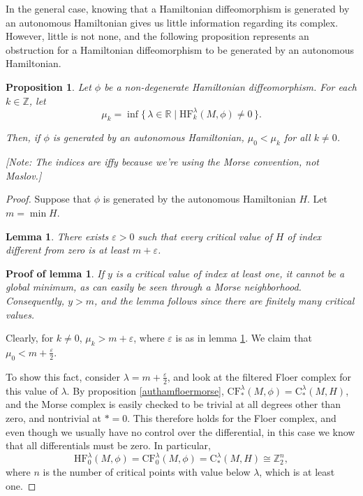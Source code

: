 \documentclass{article}
\newtheorem{prop}{Proposition}
\newtheorem{lemma}{Lemma}
\theoremstyle{nonumberplain}
\newtheorem{proof}{Proof}
\newtheorem{lemmaproof}{Proof of lemma}
\newcommand{\R}{\mathbb{R}}
\newcommand{\Z}{\mathbb{Z}}
\newcommand{\CF}{\mathrm{CF}}
\newcommand{\HF}{\mathrm{HF}}
\newcommand{\MC}{\mathrm{C}}
\begin{document}
In the general case, knowing that a Hamiltonian diffeomorphism is generated by an autonomous Hamiltonian gives us little information regarding its complex. However, little is not none, and the following proposition represents an obstruction for a Hamiltonian diffeomorphism to be generated by an autonomous Hamiltonian.

\begin{prop}
Let $\phi$ be a non-degenerate Hamiltonian diffeomorphism. For each $k \in \Z$, let
\begin{equation}
\mu_k = \inf \{\, \lambda \in \R \mid \HF_k^\lambda(M,\phi) \neq 0 \, \}.
\end{equation}

Then, if $\phi$ is generated by an autonomous Hamiltonian, $\mu_0 < \mu_k$ for all $k \neq 0$.

[Note: The indices are iffy because we're using the Morse convention, not Maslov.]
\end{prop}

\begin{proof}
Suppose that $\phi$ is generated by the autonomous Hamiltonian $H$. Let $m = \min H$.

\begin{lemma}\label{mincritval}
There exists $\varepsilon > 0$ such that every critical value of $H$ of index different from zero is at least $m+\varepsilon$.
\end{lemma}

\begin{lemmaproof}
If $y$ is a critical value of index at least one, it cannot be a global minimum, as can easily be seen through a Morse neighborhood. Consequently, $y > m$, and the lemma follows since there are finitely many critical values.
\end{lemmaproof}

Clearly, for $k \neq 0$, $\mu_k > m+\varepsilon$, where $\varepsilon$ is as in lemma \ref{mincritval}. We claim that $\mu_0 < m+\frac\varepsilon2$.

To show this fact, consider $\lambda = m+\frac\varepsilon2$, and look at the filtered Floer complex for this value of $\lambda$. By proposition \ref{authamfloermorse}, $\CF_*^\lambda(M,\phi) = \MC_*^\lambda(M,H)$, and the Morse complex is easily checked to be trivial at all degrees other than zero, and nontrivial at $*=0$. This therefore holds for the Floer complex, and even though we usually have no control over the differential, in this case we know that all differentials must be zero. In particular,
\[\HF_0^\lambda(M,\phi) = \CF_0^\lambda(M,\phi) = \MC_*^\lambda(M,H) \cong \Z_2^n,\]
where $n$ is the number of critical points with value below $\lambda$, which is at least one.
\end{proof}
\end{document}
